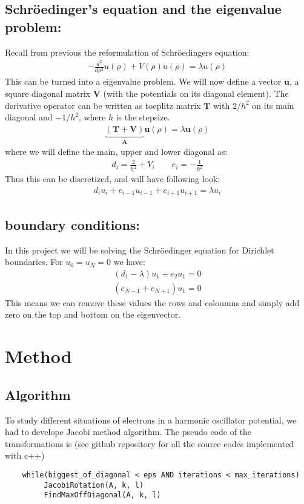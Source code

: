 \documentclass[a4paper, 10pt]{article}
\begin{document}
\subsection{Schröedinger's equation and the eigenvalue problem:}
Recall from previous the reformulation of Schröedingers equation:
\begin{align}
  -\frac{d^2}{d\rho^2}u(\rho)+V(\rho)u(\rho)=\lambda u(\rho)
\end{align}
This can be turned into a eigenvalue problem. We will now define a vector
$\mathbf{u}$, a square diagonal matrix $\mathbf{V}$ (with the potentials on its diagonal element).
The derivative operator can be written as toeplitz matrix $\mathbf{T}$ with $2/h^{2}$ on its main diagonal
and $-1/h^{2}$, where $h$ is the stepsize.
\begin{align}
  \label{matrix form}
\underbrace{\left(\mathbf{T} + \mathbf{V}\right)}_{\mathbf{A}}\mathbf{u}(\rho) = \lambda\mathbf{u}(\rho)
\end{align}
where we will define the main, upper and lower diagonal as:
\begin{align}
  d_{i} = \frac{2}{h^{2}} + V_{i} \qquad e_{i} = -\frac{1}{h^{2}}
\end{align}
Thus this can be discretized, and will have following look:
\begin{align}
  d_{i}u_{i} + e_{i-1}u_{i-1} + e_{i+1}u_{i+1} = \lambda u_{i}
\end{align}
\subsection{boundary conditions:} In this project we will be solving the
Schröedinger equation for Dirichlet boundaries. For $u_{0} = u_{N} = 0$ we have:
\begin{align}
(d_{1} - \lambda)u_{1} + e_{2}u_{1} = 0
\end{align}
\begin{align}
(e_{N-1} + e_{N+1})u_{1} = 0
\end{align}
This means we can remove these values the rows and coloumns and simply add zero
on the top and bottom on the eigenvector.

\section{Method}
\subsection{Algorithm}
To study different situations of electrons in a harmonic oscillator potential,
we had to develope Jacobi method algorithm. The pseudo code of the
transformations is (see github repository for all the source codes implemented
with c++)
\begin{lstlisting}
	while(biggest_of_diagonal < eps AND iterations < max_iterations)
         JacobiRotation(A, k, l)
         FindMaxOffDiagonal(A, k, l)
\end{lstlisting}
\end{document}
